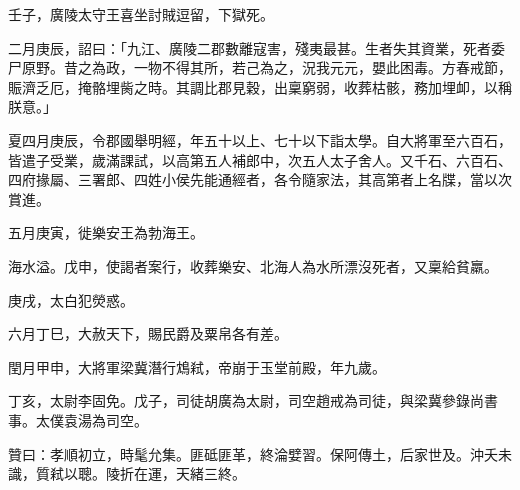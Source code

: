 \begin{pinyinscope}
壬子，廣陵太守王喜坐討賊逗留，下獄死。

二月庚辰，詔曰：「九江、廣陵二郡數離寇害，殘夷最甚。生者失其資業，死者委尸原野。昔之為政，一物不得其所，若己為之，況我元元，嬰此困毒。方春戒節，賑濟乏厄，掩骼埋胔之時。其調比郡見穀，出稟窮弱，收葬枯骸，務加埋卹，以稱朕意。」

夏四月庚辰，令郡國舉明經，年五十以上、七十以下詣太學。自大將軍至六百石，皆遣子受業，歲滿課試，以高第五人補郎中，次五人太子舍人。又千石、六百石、四府掾屬、三署郎、四姓小侯先能通經者，各令隨家法，其高第者上名牒，當以次賞進。

五月庚寅，徙樂安王為勃海王。

海水溢。戊申，使謁者案行，收葬樂安、北海人為水所漂沒死者，又稟給貧羸。

庚戌，太白犯熒惑。

六月丁巳，大赦天下，賜民爵及粟帛各有差。

閏月甲申，大將軍梁冀潛行鴆弒，帝崩于玉堂前殿，年九歲。

丁亥，太尉李固免。戊子，司徒胡廣為太尉，司空趙戒為司徒，與梁冀參錄尚書事。太僕袁湯為司空。

贊曰：孝順初立，時髦允集。匪砥匪革，終淪嬖習。保阿傳土，后家世及。沖夭未識，質弒以聰。陵折在運，天緒三終。


\end{pinyinscope}